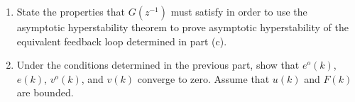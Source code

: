 \begin{enumerate}
    \item
    State the properties that $G(z^{-1})$ must satisfy in order to use the asymptotic hyperstability theorem to prove asymptotic hyperstability of the equivalent feedback loop determined in part (c).

    \item
    Under the conditions determined in the previous part, show that $e^o(k)$, $e(k)$, $v^o(k)$, and $v(k)$ converge to zero. Assume that $u(k)$ and $F(k)$ are bounded.
\end{enumerate} 